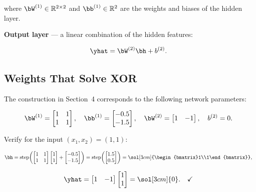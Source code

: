 \documentclass[12pt, a4paper]{article}
\begin{document}
where $\bW^{(1)} \in \mathbb{R}^{2 \times 2}$ and $\bb^{(1)} \in \mathbb{R}^2$
are the weights and biases of the hidden layer.

\textbf{Output layer} — a linear combination of the hidden features:

\begin{equation}
  \yhat = \bW^{(2)}\bh + b^{(2)}.
  \label{eq:output}
\end{equation}

\subsection{Weights That Solve XOR}

The construction in Section~4 corresponds to the following network parameters:

\[
  \bW^{(1)} =
  \begin{bmatrix} 1 & 1 \\ 1 & 1 \end{bmatrix},
  \quad
  \bb^{(1)} =
  \begin{bmatrix} -0.5 \\ -1.5 \end{bmatrix},
  \quad
  \bW^{(2)} =
  \begin{bmatrix} 1 & -1 \end{bmatrix},
  \quad
  b^{(2)} = 0.
\]

Verify for the input $(x_1, x_2) = (1, 1)$:

\[
  \bh
  = \text{step}\!\left(
  \begin{bmatrix}1&1\\1&1\end{bmatrix}
  \begin{bmatrix}1\\1\end{bmatrix}
  +
  \begin{bmatrix}-0.5\\-1.5\end{bmatrix}
  \right)
  = \text{step}\!\left(\begin{bmatrix}1.5\\0.5\end{bmatrix}\right)
  = \sol[3cm]{\begin{bmatrix}1\\1\end{bmatrix}},
\]

\[
  \yhat
  = \begin{bmatrix}1 & -1\end{bmatrix}
  \begin{bmatrix}1\\1\end{bmatrix}
  = \sol[3cm]{0}. \quad\checkmark
\]
\end{document}
